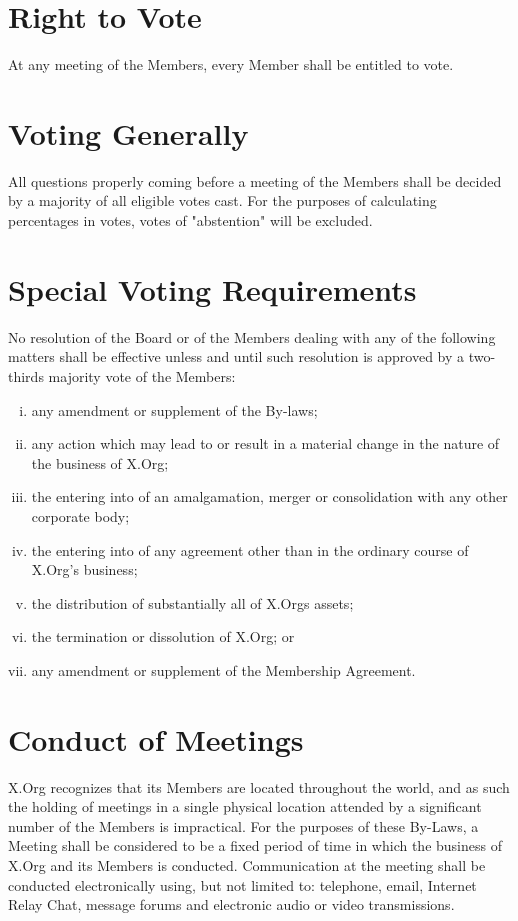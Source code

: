 \documentclass[10pt, english]{bylaws}
\begin{document}
\section{Right to Vote}
At any meeting of the Members, every Member shall be entitled to vote.

\section{Voting Generally}
All questions properly coming before a meeting of the Members shall be decided
by a majority of all eligible votes cast.  For the purposes of calculating
percentages in votes, votes of "abstention" will be excluded.

\section{Special Voting Requirements}
\label{section_voting_requirements}

No resolution of the Board or of the Members dealing with any of the following
matters shall be effective unless and until such resolution is approved by a
two-thirds majority vote of the Members:

\begin{enumerate}[(i)\hspace{.2cm}]
	\item any amendment or supplement of the By-laws;

	\item any action which may lead to or result in a material change in
	the nature of the business of X.Org;

	\item the entering into of an amalgamation, merger or consolidation with
	any other corporate body;

	\item the entering into of any agreement other than in the ordinary
	course of X.Org's business;

	\item the distribution of substantially all of X.Orgs assets;

	\item the termination or dissolution of X.Org; or

	\item any amendment or supplement of the Membership Agreement.
\end{enumerate}

\section{Conduct of Meetings}
X.Org recognizes that its Members are located throughout the world, and as such
the holding of meetings in a single physical location attended by a significant
number of the Members is impractical. For the purposes of these By-Laws, a
Meeting shall be considered to be a fixed period of time in which the business
of X.Org and its Members is conducted. Communication at the meeting shall be
conducted electronically using, but not limited to: telephone, email, Internet
Relay Chat, message forums and electronic audio or video transmissions.
\end{document}
